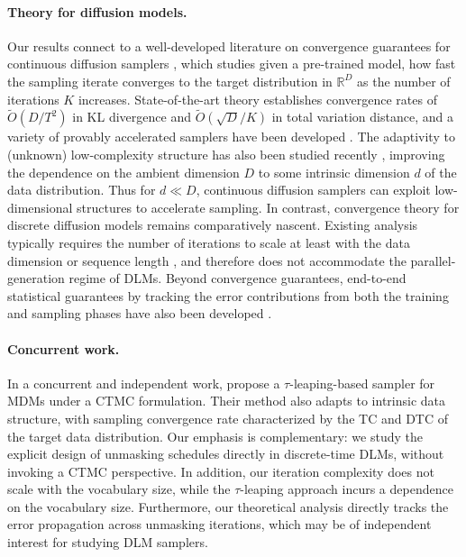 \documentclass[english]{article}
\newcommand{\bR}{\mathbb{R}}
\newcommand{\wt}{\widetilde}
\begin{document}
\paragraph{Theory for diffusion models.}

Our results connect to a well-developed literature on convergence guarantees for continuous diffusion samplers \citep{lee2022convergence,chen2022sampling,lee2023convergence,chen2023improved,benton2023linear,li2024d,li2024sharp}, which studies given a pre-trained model, how fast the sampling iterate converges to the target distribution in $\bR^D$ as the number of iterations $K$ increases.
State-of-the-art theory \citep{jiao2025optimal,zhang2025sublinear} establishes convergence rates of $\wt{O}(D/T^2)$ in KL divergence and $\wt{O}(\sqrt{D}/K)$ in total variation distance, and a variety of provably accelerated samplers have been developed \citep{li2024provable,li2024improved,gatmiry2026high,huang2024convergence,li2024accelerating,li2025faster}.
The adaptivity to (unknown) low-complexity structure has also been studied recently \citep{li2024adapting,liang2025low,huang2024denoising,potaptchik2024linear,li2025dimension}, improving the dependence on the ambient dimension $D$ to some intrinsic dimension $d$ of the data distribution.
Thus for $d \ll D$, continuous diffusion samplers can exploit low-dimensional structures to accelerate sampling.
In contrast, convergence theory for discrete diffusion models remains comparatively nascent. Existing analysis typically requires the number of iterations to scale at least with the data dimension or sequence length \citep{chen2024convergence,liang2025absorb,feng2025theoretical,ren2025fast,ren2024discrete}, and therefore does not accommodate the parallel-generation regime of DLMs.
Beyond convergence guarantees, end-to-end statistical guarantees by tracking the error contributions from both the training and sampling phases have also been developed \citep{oko2023diffusion,wibisono2024optimal,zhang2024minimax,cai2025minimax,gatmiry2024learning,chen2024learning}.

\paragraph{Concurrent work.}
In a concurrent and independent work, \citet{dmitriev2026efficient} propose a $\tau$-leaping-based sampler for MDMs under a CTMC formulation. Their method also adapts to intrinsic data structure, with sampling convergence rate characterized by the TC and DTC of the target data distribution.
Our emphasis is complementary: we study the explicit design of unmasking schedules directly in discrete-time DLMs, without invoking a CTMC perspective.
In addition, our iteration complexity does not scale with the vocabulary size, while the $\tau$-leaping approach incurs a dependence on the vocabulary size.
Furthermore, our theoretical analysis directly tracks the error propagation across unmasking iterations, which may be of independent interest for studying DLM samplers.
\end{document}
